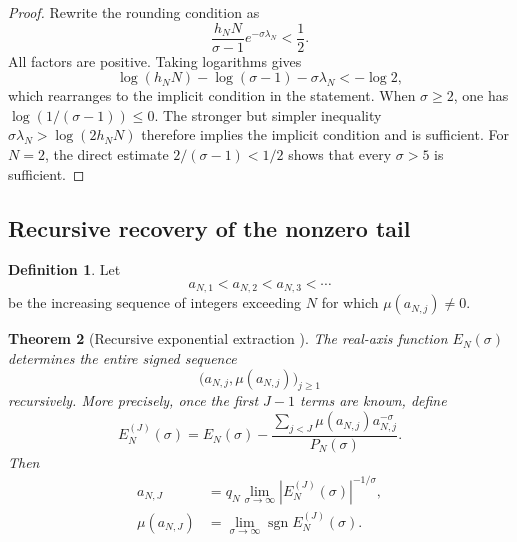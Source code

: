 \documentclass[11pt]{amsart}
\numberwithin{equation}{section}
\theoremstyle{plain}
\newtheorem{theorem}{Theorem}[section]
\theoremstyle{definition}
\newtheorem{definition}[theorem]{Definition}
\theoremstyle{remark}
\newcommand{\1}{\mathbf{1}}
\begin{document}
\begin{proof}
Rewrite the rounding condition as
\begin{equation}
\frac{h_NN}{\sigma-1}e^{-\sigma\lambda_N}<\frac12.
\label{eq:explicit_threshold_exponential_form}
\end{equation}
All factors are positive.  Taking logarithms gives
\begin{equation}
\log(h_NN)-\log(\sigma-1)-\sigma\lambda_N<-
\log2,
\label{eq:explicit_threshold_log_form}
\end{equation}
which rearranges to the implicit condition in the statement.  When
\(\sigma\geq2\), one has \(\log(1/(\sigma-1))\leq0\).  The stronger but
simpler inequality
\(\sigma\lambda_N>\log(2h_NN)\) therefore implies the implicit condition
and is sufficient.  For $N=2$, the direct estimate
$2/(\sigma-1)<1/2$ shows that every $\sigma>5$ is sufficient.
\end{proof}

\subsection{Recursive recovery of the nonzero tail}
\label{subsec:recursive_tail_recovery}

\begin{definition}
\label{def:tail_support_sequence}
Let
\begin{equation}
a_{N,1}<a_{N,2}<a_{N,3}<\cdots
\label{eq:tail_support_sequence}
\end{equation}
be the increasing sequence of integers exceeding $N$ for which
$\mu(a_{N,j})\neq0$.
\end{definition}


\begin{theorem}[Recursive exponential extraction {}]
\label{thm:recursive_extraction}
The real-axis function $E_N(\sigma)$ determines the entire signed sequence
\begin{equation}
\bigl(a_{N,j},\mu(a_{N,j})\bigr)_{j\geq1}
\label{eq:entire_tail_sequence}
\end{equation}
recursively.  More precisely, once the first $J-1$ terms are known, define
\begin{equation}
E_N^{(J)}(\sigma)
=
E_N(\sigma)-
\frac{\sum_{j<J}\mu(a_{N,j})a_{N,j}^{-\sigma}}{P_N(\sigma)}.
\label{eq:residual_tail_J}
\end{equation}
Then
\begin{align}
a_{N,J}
&=
q_N\lim_{\sigma\to\infty}
|E_N^{(J)}(\sigma)|^{-1/\sigma},
\label{eq:recursive_position}
\\
\mu(a_{N,J})
&=
\lim_{\sigma\to\infty}
\operatorname{sgn}E_N^{(J)}(\sigma).
\label{eq:recursive_sign}
\end{align}
\end{theorem}
\end{document}
